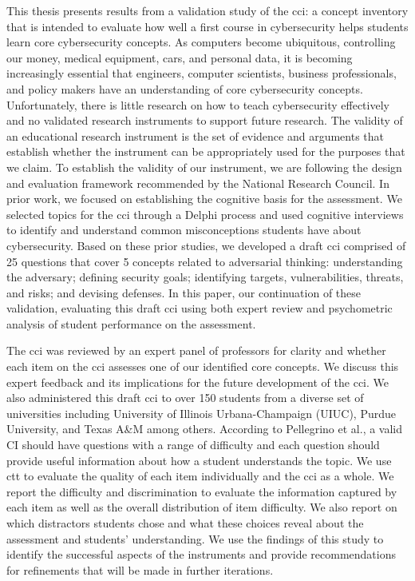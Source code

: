 \iflong
This thesis presents results from a validation study of the \glsdesc{cci}: a concept inventory that is intended to evaluate how well a first course in cybersecurity helps students learn core cybersecurity concepts. 
\fi
As computers become ubiquitous, controlling our money, medical equipment, cars, and personal data, it is becoming increasingly essential that engineers, computer scientists, business professionals, and policy makers have an understanding of core cybersecurity concepts. Unfortunately, there is little research on how to teach cybersecurity effectively and no validated research instruments to support future research. The validity of an educational research instrument is the set of evidence and arguments that establish whether the instrument can be appropriately used for the purposes that we claim. To establish the validity of our instrument, we are following the design and evaluation framework recommended by the National Research Council. In prior work, we focused on establishing the cognitive basis for the assessment. We selected topics for the \gls{cci} through a Delphi process and used cognitive interviews to identify and understand common misconceptions students have about cybersecurity. Based on these prior studies, we developed a draft \gls{cci} comprised of 25 questions that cover 5 concepts related to adversarial thinking: understanding the adversary; defining security goals; identifying targets, vulnerabilities, threats, and risks; and devising defenses. In this paper, our continuation of these validation, evaluating this draft \gls{cci} using both expert review and psychometric analysis of student performance on the assessment.

\iflong
The \gls{cci} was reviewed by an expert panel of professors for clarity and whether each item on the \gls{cci} assesses one of our identified core concepts. We discuss this expert feedback and its implications for the future development of the \gls{cci}. We also administered this draft \gls{cci} to over 150 students from a diverse set of universities including University of Illinois Urbana-Champaign (UIUC), Purdue University, and Texas A\&M among others. According to Pellegrino et al., a valid CI should have questions with a range of difficulty and each question should provide useful information about how a student understands the topic. We use \gls{ctt} to evaluate the quality of each item individually and the \gls{cci} as a whole. We report the difficulty and discrimination to evaluate the information captured by each item as well as the overall distribution of item difficulty. We also report on which distractors students chose and what these choices reveal about the assessment and students’ understanding. We use the findings of this study to identify the successful aspects of the instruments and provide recommendations for refinements that will be made in further iterations. 
\fi